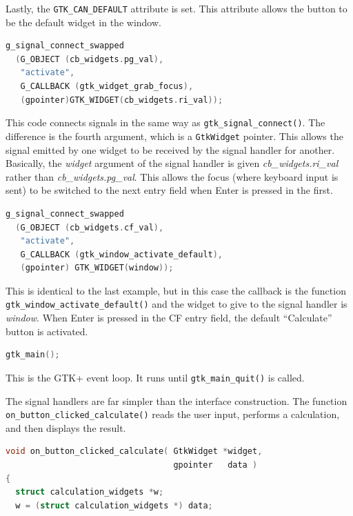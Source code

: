 \documentclass[a4paper,oneside]{article}
\newcommand{\variable}[1]{\textsl{#1}}
\newcommand{\class}[1]{\texttt{#1}}
\newcommand{\function}[1]{\texttt{#1()}}
\newcommand{\code}[1]{\texttt{#1}}
\begin{document}
Lastly, the \code{GTK\_CAN\_DEFAULT} attribute is set.  This attribute
allows the button to be the default widget in the window.

\begin{lstlisting}[numbers=none, language=C]
g_signal_connect_swapped
  (G_OBJECT (cb_widgets.pg_val),
   "activate",
   G_CALLBACK (gtk_widget_grab_focus),
   (gpointer)GTK_WIDGET(cb_widgets.ri_val));
\end{lstlisting}

This code connects signals in the same way as
\function{gtk\_signal\_connect}.  The difference is the fourth
argument, which is a \class{GtkWidget} pointer.  This allows the
signal emitted by one widget to be received by the signal handler for
another.  Basically, the \variable{widget} argument of the signal
handler is given \variable{cb\_widgets.ri\_val} rather than
\variable{cb\_widgets.pg\_val}.  This allows the focus (where keyboard
input is sent) to be switched to the next entry field when Enter is
pressed in the first.

\begin{lstlisting}[numbers=none, language=C]
g_signal_connect_swapped
  (G_OBJECT (cb_widgets.cf_val),
   "activate",
   G_CALLBACK (gtk_window_activate_default),
   (gpointer) GTK_WIDGET(window));
\end{lstlisting}

This is identical to the last example, but in this case the callback
is the function \function{gtk\_window\_activate\_default} and the widget
to give to the signal handler is \variable{window}.  When Enter is
pressed in the CF entry field, the default ``Calculate'' button is
activated.

\begin{lstlisting}[numbers=none, language=C]
gtk_main();
\end{lstlisting}

This is the GTK+ event loop.  It runs until \function{gtk\_main\_quit}
is called.

The signal handlers are far simpler than the interface construction.
The function \function{on\_button\_clicked\_calculate} reads the user
input, performs a calculation, and then displays the result.

\begin{lstlisting}[numbers=none, language=C]
void on_button_clicked_calculate( GtkWidget *widget,
                                  gpointer   data )
{
  struct calculation_widgets *w;
  w = (struct calculation_widgets *) data;
\end{lstlisting}
\end{document}
